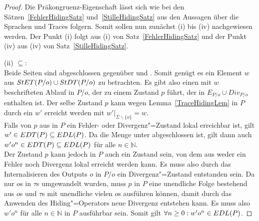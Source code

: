 \begin{proof}
  Die Präkongruenz-Eigenschaft lässt sich wie bei den
  Sätzen~\ref{FehlerHidingSatz} und~\ref{StilleHidingSatz} aus den Aussagen
  über die Sprachen und Traces folgern. Somit sollen nun zunächst (i) bis (iv)
  nachgewiesen werden. Der Punkt (i) folgt aus (i) von
  Satz~\ref{FehlerHidingSatz} und der Punkt (iv) aus (iv) von
  Satz~\ref{StilleHidingSatz}.

  (ii) \glqq $\subseteq$\grqq{}:\\
  Beide Seiten sind abgeschlossen gegenüber \prune{} und \cont{}. Somit genügt
  es ein Element $w$ aus $StET (P/o)\cup StDT (P/o)$ zu betrachten. Es gibt
  also einen mit $w$ beschrifteten Ablauf in $P/o$, der zu einem Zustand $p$
  führt, der in $E_{P/o}\cup Div_{P/o}$ enthalten ist. Der selbe Zustand $p$
  kann wegen Lemma~\ref{TraceHidingLem} in $P$ durch ein $w'$ erreicht werden
  mit $w'|_{\Sigma\backslash\{o\}} = w$.\\
  Falls von $p$ aus in $P$ ein Fehler- oder Divergenz"=Zustand lokal erreichbar
  ist, gilt $w'\in EDT (P)\subseteq EDL (P)$. Da die Menge \EDL{} unter
  \cont{} abgeschlossen ist, gilt dann auch $w'o^n\in EDT (P)\subseteq EDL (P)$
  für alle $n\in\mathbb{N}$.\\
  Der Zustand $p$ kann jedoch in $P$ auch ein Zustand sein, von dem aus weder
  ein Fehler noch Divergenz lokal erreicht werden kann. Es muss also durch das
  Internalisieren des Outputs $o$ in $P/o$ ein Divergenz"=Zustand entstanden
  sein. Da nur $o$s in $\tau$s umgewandelt wurden, muss $p$ in $P$ eine
  unendliche Folge bestehend aus $o$s und $\tau$s mit unendliche vielen $o$s
  ausführen können, damit durch das Anwenden des Hiding"=Operators neue
  Divergenz entstehen kann. Es muss also $w'o^n$ für alle $n\in\mathbb{N}$ in
  $P$ ausführbar sein. Somit gilt $\forall n\geq 0: w'o^n\in EDL (P)$.


\end{proof}
